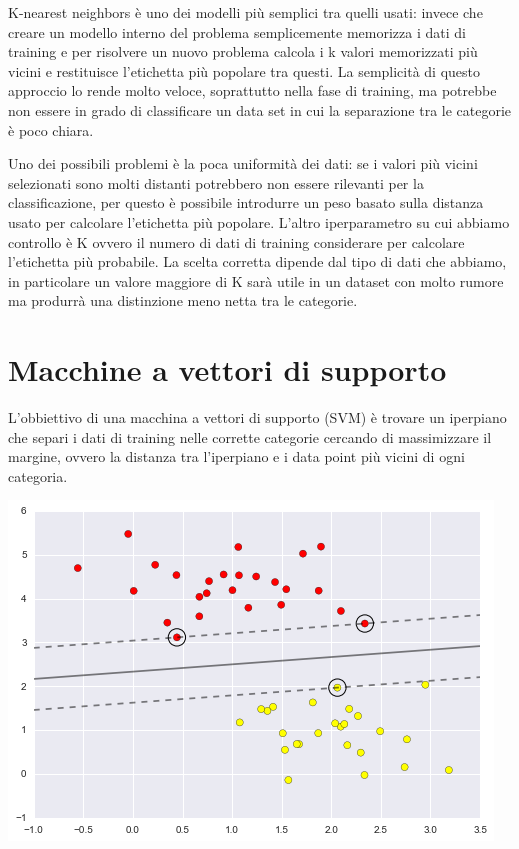 \documentclass[a4paper,12pt]{report}
\begin{document}
K-nearest neighbors è uno dei modelli più semplici tra quelli usati: invece che
creare un modello interno del problema semplicemente memorizza i dati di
training e per risolvere un nuovo problema calcola i k valori memorizzati più
vicini e restituisce l'etichetta più popolare tra questi. La semplicità di
questo approccio lo rende molto veloce, soprattutto nella fase di training, ma
potrebbe non essere in grado di classificare un data set in cui la separazione
tra le categorie è poco chiara.

Uno dei possibili problemi è la poca uniformità dei dati: se i valori più vicini
selezionati sono molti distanti potrebbero non essere rilevanti per la
classificazione, per questo è possibile introdurre un peso basato sulla distanza
usato per calcolare l'etichetta più popolare. L'altro iperparametro su cui
abbiamo controllo è K ovvero il numero di dati di training considerare per
calcolare l'etichetta più probabile. La scelta corretta dipende dal tipo di dati
che abbiamo, in particolare un valore maggiore di K sarà utile in un dataset con
molto rumore ma produrrà una distinzione meno netta tra le categorie.

\section{Macchine a vettori di supporto}

L'obbiettivo di una macchina a vettori di supporto (SVM) è trovare un iperpiano
che separi i dati di training nelle corrette categorie cercando di massimizzare
il margine, ovvero la distanza tra l'iperpiano e i data point più vicini di
ogni categoria.

\includegraphics[scale=.7]{Immagini/SVM margine.png} \cite{Data science handbook}
\\
\end{document}
